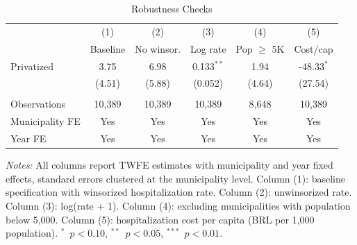 \begin{table}[H]
\centering
\caption{Robustness Checks}
\label{tab:robustness}
\begin{threeparttable}
\begin{tabular}{lccccc}
\toprule
 & (1) & (2) & (3) & (4) & (5) \\
 & Baseline & No winsor. & Log rate & Pop $\geq$ 5K & Cost/cap \\
\midrule
  Privatized & 3.75 & 6.98 & 0.133$^{**}$ & 1.94 & -48.33$^{*}$ \\
  & (4.51) & (5.88) & (0.052) & (4.64) & (27.54) \\
\\
  Observations & 10,389 & 10,389 & 10,389 & 8,648 & 10,389 \\
  Municipality FE & Yes & Yes & Yes & Yes & Yes \\
  Year FE & Yes & Yes & Yes & Yes & Yes \\
\bottomrule
\end{tabular}
\begin{tablenotes}[flushleft]
\small
\item \textit{Notes:} All columns report TWFE estimates with municipality and year fixed effects, standard errors clustered at the municipality level. Column (1): baseline specification with winsorized hospitalization rate. Column (2): unwinsorized rate. Column (3): log(rate + 1). Column (4): excluding municipalities with population below 5,000. Column (5): hospitalization cost per capita (BRL per 1,000 population). $^{*}$~$p<0.10$, $^{**}$~$p<0.05$, $^{***}$~$p<0.01$.
\end{tablenotes}
\end{threeparttable}
\end{table}
